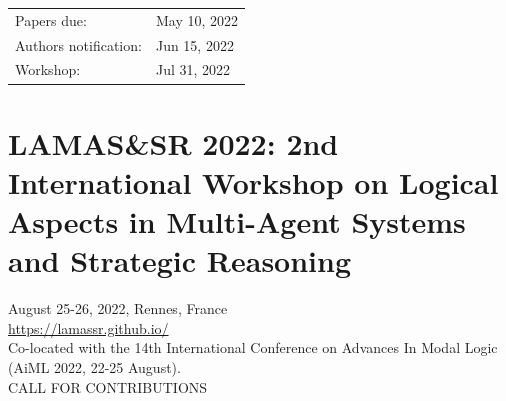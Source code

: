 \documentclass[prodmode,acmtecs]{acmsmall} %
\begin{document}
\begin{itemize}
\begin{tabulary}{\linewidth}{LL}Papers due:  & May 10, 2022 \\
Authors notification:  & Jun 15, 2022 \\
Workshop:  & Jul 31, 2022 \\
\end{tabulary}
 
\end{itemize}\section{LAMAS\&SR 2022: 2nd International Workshop on Logical Aspects in Multi-Agent Systems and Strategic Reasoning}\label{LAMASSR2022}  August 25-26, 2022, Rennes, France\\ 
  \href{https://lamassr.github.io/}{https://lamassr.github.io/} \\ 
  Co-located with the 14th International Conference on Advances In Modal Logic (AiML 2022, 22-25 August).\\ 
CALL FOR CONTRIBUTIONS 
\end{document}
